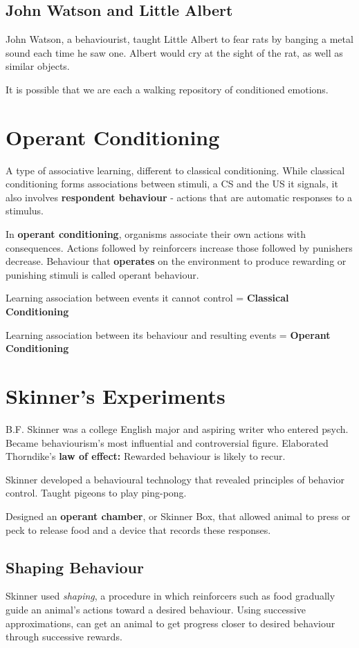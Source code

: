 \documentclass[12pt]{article}
\begin{document}
\subsection*{John Watson and Little Albert}
John Watson, a behaviourist, taught Little Albert to fear rats by banging a metal sound each time he saw one. Albert would cry at the sight of the rat, as well as similar objects.

It is possible that we are each a walking repository of conditioned emotions. 

\section*{Operant Conditioning}
A type of associative learning, different to classical conditioning. While classical conditioning forms associations between stimuli, a CS and the US it signals, it also involves \textbf{respondent behaviour} - actions that are automatic responses to a stimulus. 

In \textbf{operant conditioning}, organisms associate their own actions with consequences. Actions followed by reinforcers increase those followed by punishers decrease. Behaviour that \textbf{operates} on the environment to produce rewarding or punishing stimuli is called operant behaviour. 

Learning association between events it cannot control = \textbf{Classical Conditioning}

Learning association between its behaviour and resulting events = \textbf{Operant Conditioning}

\section*{Skinner's Experiments}
B.F. Skinner was a college English major and aspiring writer who entered psych. Became behaviourism's most influential and controversial figure. Elaborated Thorndike's \textbf{law of effect:} Rewarded behaviour is likely to recur.

Skinner developed a behavioural technology that revealed principles of behavior control. Taught pigeons to play ping-pong.

Designed an \textbf{operant chamber}, or Skinner Box, that allowed animal to press or peck to release food and a device that records these responses. 

\subsection*{Shaping Behaviour}
Skinner used \textit{shaping}, a procedure in which reinforcers such as food gradually guide an animal's actions toward a desired behaviour. Using successive approximations, can get an animal to get progress closer to desired behaviour through successive rewards.
\end{document}
